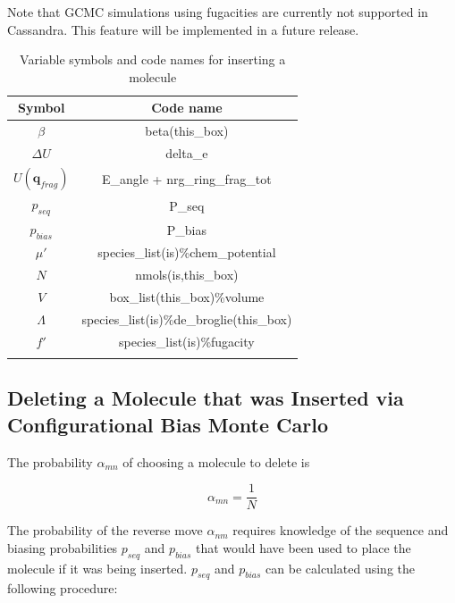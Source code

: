 Note that GCMC simulations using fugacities are currently not supported in Cassandra. This feature
will be implemented in a future release.

\begin{table}
\caption{Variable symbols and code names for inserting a molecule}
\label{table:cbmcInsert}
\centering
\begin{tabular}{|c|c|} \hline
 {\bf Symbol} & {\bf Code name} \\ \hline
 $\beta$ & beta(this\_box) \\
 $\Delta U$ & delta\_e \\
 $U(\mathbf{q}_{frag})$ & E\_angle + nrg\_ring\_frag\_tot \\
 $p_{seq}$ & P\_seq \\
 $p_{bias}$ & P\_bias \\
 $\mu'$ & species\_list(is)\%chem\_potential \\
 $N$ & nmols(is,this\_box) \\
 $V$ & box\_list(this\_box)\%volume \\
 $\Lambda$ & species\_list(is)\%de\_broglie(this\_box) \\
 $f'$ & species\_list(is)\%fugacity \\
 \hline
\multicolumn{2}{c}{}
\end{tabular}
\end{table}

\subsection{Deleting a Molecule that was Inserted via \newline Configurational Bias Monte Carlo}
\label{sec:cbmcDelete}

The probability $\alpha_{mn}$ of choosing a molecule to delete is

\begin{equation}
\alpha_{mn} = \frac{1}{N}
\end{equation}

The probability of the reverse move $\alpha_{nm}$ requires knowledge of the sequence and biasing probabilities $p_{seq}$ and $p_{bias}$ that would have been used to place the molecule if it was being inserted. $p_{seq}$ and $p_{bias}$ can be calculated using the following procedure:

